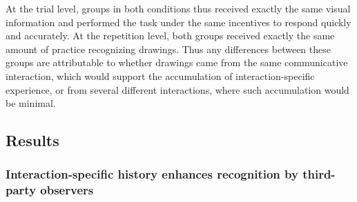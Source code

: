 \documentclass[10pt,letterpaper]{article}
\begin{document}
At the trial level, groups in both conditions thus received exactly the same visual information and performed the task under the same incentives to respond quickly and accurately.
At the repetition level, both groups received exactly the same amount of practice recognizing drawings.
Thus any differences between these groups are attributable to whether drawings came from the same communicative interaction, which would support the accumulation of interaction-specific experience, or from several different interactions, where such accumulation would be minimal.

\subsection{Results}

\subsubsection{Interaction-specific history enhances recognition by third-party observers}


\end{document}
